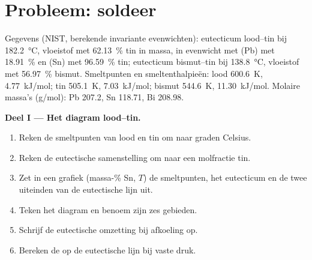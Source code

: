 \section{Probleem: soldeer}

\begin{problem}
\label{pb:b2:solid-liquid-diagrams:1}
Gegevens (NIST, berekende invariante evenwichten): eutecticum lood--tin bij
\qty{182.2}{\degreeCelsius}, vloeistof met 62.13~\% tin in massa, in evenwicht met
(Pb) met 18.91~\% en (Sn) met 96.59~\% tin; eutecticum bismut--tin bij
\qty{138.8}{\degreeCelsius}, vloeistof met 56.97~\% bismut. Smeltpunten en
smeltenthalpieën: lood \qty{600.6}{K}, \qty{4.77}{kJ/mol}; tin
\qty{505.1}{K}, \qty{7.03}{kJ/mol}; bismut \qty{544.6}{K}, \qty{11.30}{kJ/mol}.
Molaire massa's (\unit{g/mol}): Pb 207.2, Sn 118.71, Bi 208.98.

\medskip
\noindent\textbf{Deel I --- Het diagram lood--tin.}
\begin{enumerate}
  \item Reken de smeltpunten van lood en tin om naar graden Celsius.
  \item Reken de eutectische samenstelling om naar een molfractie tin.
  \item Zet in een grafiek (massa-\% Sn, $T$) de smeltpunten, het eutecticum en
        de twee uiteinden van de eutectische lijn uit.
  \item Teken het diagram en benoem zijn zes gebieden.
  \item Schrijf de eutectische omzetting bij afkoeling op.
  \item Bereken de  op de eutectische lijn bij vaste druk.
\end{enumerate}


\end{problem}
